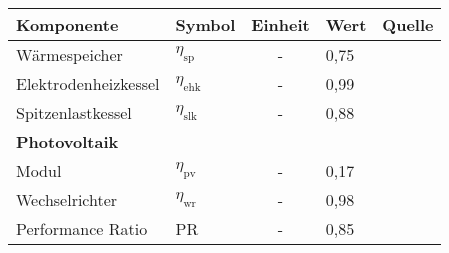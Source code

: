 	\begin{center}
	\label{tabelle: Wirkungsgrade Speicher, EHK, SLK und PV}
		\begin{tabular}{llclc}
			\hline 
			\rule{0pt}{12pt} Komponente  & Symbol  & Einheit  & Wert & Quelle\tabularnewline
			\hline 
			Wärmespeicher  & $\eta_\text{sp}$  & - & 0,75 & \cite{Kaldemeyer2019}  \tabularnewline
			Elektrodenheizkessel  & $\eta_\text{ehk}$ & - & 0,99 &\cite{Energinet} \tabularnewline
			Spitzenlastkessel  & $\eta_\text{slk}$ & - & 0,88 &\cite{Volta2018} \tabularnewline
			\textbf{Photovoltaik} & & & &\tabularnewline
			Modul  & $\eta_\text{pv}$  & - & 0,17 &\cite{ISE10}  \tabularnewline
			Wechselrichter  & $\eta_\text{wr}$  & - & 0,98 &\cite{ISE}  \tabularnewline
			Performance Ratio  & PR  & - & 0,85 &\cite{ISE}  \tabularnewline
			\hline
		\end{tabular}
	\end{center} 
